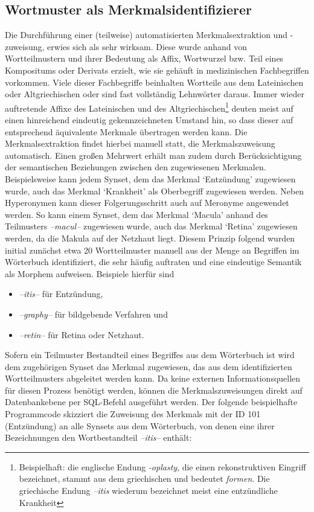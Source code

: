 \documentclass[pagesize,DIV=calc,12pt,draft]{scrreprt}
\begin{document}
\subsection{Wortmuster als Merkmalsidentifizierer}

Die Durchführung einer (teilweise) automatisierten Merkmalsextraktion und -zuweisung, erwies sich als sehr wirksam. 
Diese wurde anhand von Wortteilmustern und ihrer Bedeutung als Affix, Wortwurzel bzw. 
Teil eines Kompositums oder Derivats erzielt, wie sie gehäuft in medizinischen Fachbegriffen vorkommen. 
Viele dieser Fachbegriffe beinhalten Wortteile aus dem Lateinischen oder Altgriechischen oder sind fast vollständig Lehnwörter daraus. 
Immer wieder auftretende Affixe des Lateinischen und des Altgriechischen\footnote{Beispielhaft: die englische Endung \emph{-oplasty}, die einen rekonstruktiven Eingriff bezeichnet, stammt aus dem griechischen und bedeutet \emph{formen}. 
Die griechische Endung \emph{--itis} wiederum bezeichnet meist eine entzündliche Krankheit} deuten meist auf einen hinreichend eindeutig gekennzeichneten Umstand hin, so dass dieser auf entsprechend äquivalente Merkmale übertragen werden kann. 
Die Merkmalsextraktion findet hierbei manuell statt, die Merkmalszuweisung automatisch. 
Einen großen Mehrwert erhält man zudem durch Berücksichtigung der semantischen Beziehungen zwischen den zugewiesenen Merkmalen. 
Beispielsweise kann jedem Synset, dem das Merkmal `Entzündung' zugewiesen wurde, auch das Merkmal `Krankheit' als Oberbegriff zugewiesen werden. 
Neben Hyperonymen kann dieser Folgerungsschritt auch auf Meronyme angewendet werden. 
So kann einem Synset, dem das Merkmal `Macula' anhand des Teilmusters \emph{--macul--} zugewiesen wurde, auch das Merkmal `Retina' zugewiesen werden, da die Makula auf der Netzhaut liegt. 
Diesem Prinzip folgend wurden initial zunächst etwa 20 Wortteilmuster manuell aus der Menge an Begriffen im Wörterbuch identifiziert, die sehr häufig auftraten und eine eindeutige Semantik als Morphem aufweisen. 
Beispiele hierfür sind 

\begin{itemize}
\item
 \emph{--itis--} für Entzündung,
\item
 \emph{--graphy--} für bildgebende Verfahren und
\item
 \emph{--retin--} für Retina oder Netzhaut.
\end{itemize}

Sofern ein Teilmuster Bestandteil eines Begriffes aus dem Wörterbuch ist wird dem zugehörigen Synset das Merkmal zugewiesen, das aus dem identifizierten Wortteilmusters abgeleitet werden kann. 
Da keine externen Informationsquellen für diesen Prozess benötigt werden, können die Merkmalszuweisungen direkt auf Datenbankebene per SQL-Befehl ausgeführt werden. 
Der folgende beispielhafte Programmcode skizziert die Zuweisung des Merkmals mit der ID 101 (Entzündung) an alle Synsets aus dem Wörterbuch, von denen eine ihrer Bezeichnungen den Wortbestandteil \emph{--itis--} enthält: 
\end{document}
